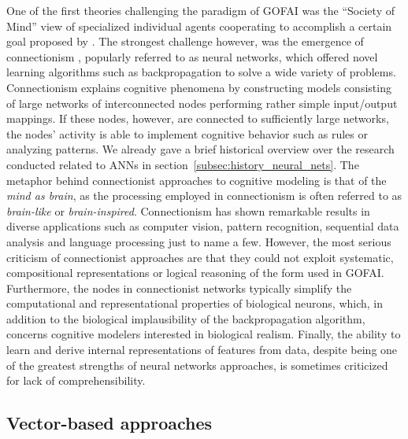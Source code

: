 One of the first theories challenging the paradigm of \ac{GOFAI} was the \enquote{Society of Mind} view of specialized individual agents cooperating to accomplish a certain goal proposed by \textcite{Minsky1986}.
The strongest challenge however, was the emergence of connectionism \parencite{Rumelhart1986a}, popularly referred to as neural networks, which offered novel learning algorithms such as backpropagation \parencite{Rumelhart1986} to solve a wide variety of problems.
Connectionism explains cognitive phenomena by constructing models consisting of large networks of interconnected nodes performing rather simple input/output mappings.
If these nodes, however, are connected to sufficiently large networks, the nodes' activity is able to implement cognitive behavior such as rules or analyzing patterns.
We already gave a brief historical overview over the research conducted related to \acp{ANN} in section~\ref{subsec:history_neural_nets}. 
The metaphor behind connectionist approaches to cognitive modeling is that of the \emph{mind as brain}, as the processing employed in connectionism is often referred to as \emph{brain-like} or \emph{brain-inspired}.
Connectionism has shown remarkable results in diverse applications such as computer vision, pattern recognition, sequential data analysis and language processing just to name a few.
However, the most serious criticism of connectionist approaches are that they could not exploit systematic, compositional representations or logical reasoning of the form used in \ac{GOFAI}. 
Furthermore, the nodes in connectionist networks typically simplify the computational and representational properties of biological neurons, which, in addition to the biological implausibility of the backpropagation algorithm, concerns cognitive modelers interested in biological realism.
Finally, the ability to learn and derive internal representations of features from data, despite being one of the greatest strengths of neural networks approaches, is sometimes criticized for lack of comprehensibility.

\subsection{Vector-based approaches}%
\label{subsec:vector_based_approaches}

